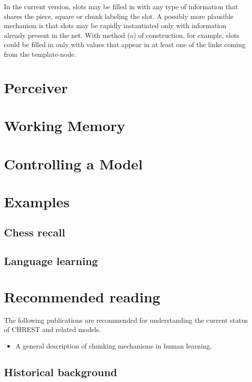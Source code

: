 \documentclass{article}
\begin{document}
In the current version, slots may be filled in with any type of information
that shares the piece, square or chunk labeling the slot. A possibly more
plausible mechanism is that slots may be rapidly instantiated only with
information already present in the net.  With method (a) of construction, for
example, slots could be filled in only with values that appear in at least one
of the links coming from the template-node.


\section{Perceiver}

\section{Working Memory}

\section{Controlling a Model}

\section{Examples}

\subsection{Chess recall}

\subsection{Language learning}


\section{Recommended reading}

The following publications are recommended for understanding the current 
status of CHREST and related models.

\begin{itemize}
\item A general description of chunking mechanisms in human learning.\cite{Gobet01}
\end{itemize}


\subsection{Historical background}
\end{document}
